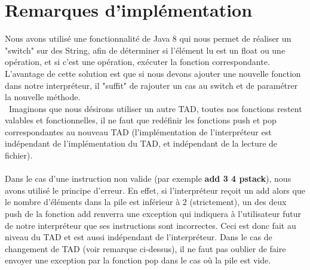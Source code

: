 \documentclass{article}
\begin{document}
\section*{Remarques d'implémentation}
Nous avons utilisé une fonctionnalité de Java 8 qui nous permet de réaliser un "switch" sur des String, afin de déterminer si l'élément lu est un float ou une opération, et si c'est une opération, exécuter la fonction correspondante. L'avantage de cette solution est que si nous devons ajouter une nouvelle fonction dans notre interpréteur, il "suffit" de rajouter un cas au switch et de paramétrer la nouvelle méthode. \\\
Imaginons que nous désirons utiliser un autre TAD, toutes nos fonctions restent valables et fonctionnelles, il ne faut que redéfinir les fonctions push et pop correspondantes au nouveau TAD (l'implémentation de l'interpréteur est indépendant de l'implémentation du TAD, et indépendant de la lecture de fichier).\\\\
Dans le cas d'une instruction non valide (par exemple \textbf{add 3 4 pstack}), nous avons utilisé le principe d'erreur. En effet, si l'interpréteur reçoit un add alors que le nombre d'éléments dans la pile est inférieur à 2 (strictement), un des deux push de la fonction add renverra une exception qui indiquera à l'utilisateur futur de notre interpréteur que ses instructions sont incorrectes. Ceci est donc fait au niveau du TAD et est aussi indépendant de l'interpréteur. Dans le cas de changement de TAD (voir remarque ci-dessus), il ne faut pas oublier de faire envoyer une exception par la fonction pop dans le cas où la pile est vide.
 
\end{document}

